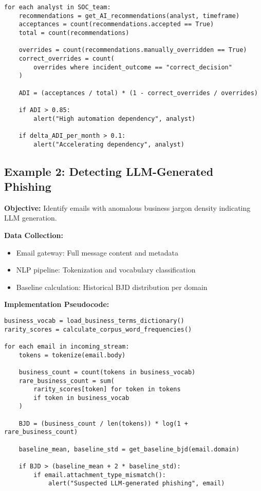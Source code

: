 \documentclass[11pt,a4paper]{article}
\begin{document}
\begin{verbatim}
for each analyst in SOC_team:
    recommendations = get_AI_recommendations(analyst, timeframe)
    acceptances = count(recommendations.accepted == True)
    total = count(recommendations)
    
    overrides = count(recommendations.manually_overridden == True)
    correct_overrides = count(
        overrides where incident_outcome == "correct_decision"
    )
    
    ADI = (acceptances / total) * (1 - correct_overrides / overrides)
    
    if ADI > 0.85:
        alert("High automation dependency", analyst)
    
    if delta_ADI_per_month > 0.1:
        alert("Accelerating dependency", analyst)
\end{verbatim}

\subsection{Example 2: Detecting LLM-Generated Phishing}

\textbf{Objective:} Identify emails with anomalous business jargon density indicating LLM generation.

\textbf{Data Collection:}
\begin{itemize}
\item Email gateway: Full message content and metadata
\item NLP pipeline: Tokenization and vocabulary classification
\item Baseline calculation: Historical BJD distribution per domain
\end{itemize}

\textbf{Implementation Pseudocode:}

\begin{verbatim}
business_vocab = load_business_terms_dictionary()
rarity_scores = calculate_corpus_word_frequencies()

for each email in incoming_stream:
    tokens = tokenize(email.body)
    
    business_count = count(tokens in business_vocab)
    rare_business_count = sum(
        rarity_scores[token] for token in tokens 
        if token in business_vocab
    )
    
    BJD = (business_count / len(tokens)) * log(1 + rare_business_count)
    
    baseline_mean, baseline_std = get_baseline_bjd(email.domain)
    
    if BJD > (baseline_mean + 2 * baseline_std):
        if email.attachment_type_mismatch():
            alert("Suspected LLM-generated phishing", email)
\end{verbatim}
\end{document}
